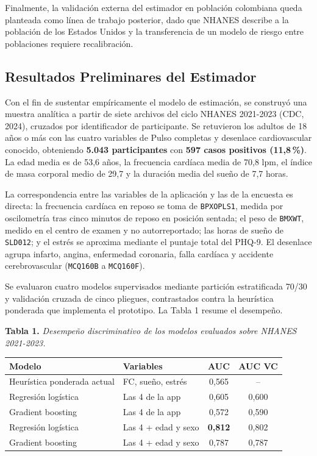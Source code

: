 \documentclass[12pt,letterpaper]{article}
\begin{document}
Finalmente, la validación externa del estimador en población colombiana queda
planteada como línea de trabajo posterior, dado que NHANES describe a la
población de los Estados Unidos y la transferencia de un modelo de riesgo entre
poblaciones requiere recalibración.

\subsection{Resultados Preliminares del Estimador}

Con el fin de sustentar empíricamente el modelo de estimación, se construyó una
muestra analítica a partir de siete archivos del ciclo NHANES 2021-2023 (CDC,
2024), cruzados por identificador de participante. Se retuvieron los adultos de
18 años o más con las cuatro variables de Pulso completas y desenlace
cardiovascular conocido, obteniendo \textbf{5.043 participantes} con
\textbf{597 casos positivos (11,8\,\%)}. La edad media es de 53,6 años, la
frecuencia cardíaca media de 70,8 lpm, el índice de masa corporal medio de 29,7 y
la duración media del sueño de 7,7 horas.

La correspondencia entre las variables de la aplicación y las de la encuesta es
directa: la frecuencia cardíaca en reposo se toma de \texttt{BPXOPLS1}, medida
por oscilometría tras cinco minutos de reposo en posición sentada; el peso de
\texttt{BMXWT}, medido en el centro de examen y no autorreportado; las horas de
sueño de \texttt{SLD012}; y el estrés se aproxima mediante el puntaje total del
PHQ-9. El desenlace agrupa infarto, angina, enfermedad coronaria, falla cardíaca
y accidente cerebrovascular (\texttt{MCQ160B} a \texttt{MCQ160F}).

Se evaluaron cuatro modelos supervisados mediante partición estratificada 70/30 y
validación cruzada de cinco pliegues, contrastados contra la heurística ponderada
que implementa el prototipo. La Tabla 1 resume el desempeño.

\vspace{0.3cm}
\noindent\textbf{Tabla 1.} \textit{Desempeño discriminativo de los modelos
evaluados sobre NHANES 2021-2023.}

\vspace{0.2cm}
\noindent\begin{tabular}{p{5.1cm}p{3.6cm}cc}
\hline
\textbf{Modelo} & \textbf{Variables} & \textbf{AUC} & \textbf{AUC VC} \\
\hline
Heurística ponderada actual & FC, sueño, estrés & 0,565 & -- \\
Regresión logística & Las 4 de la app & 0,605 & 0,600 \\
Gradient boosting & Las 4 de la app & 0,572 & 0,590 \\
Regresión logística & Las 4 + edad y sexo & \textbf{0,812} & 0,802 \\
Gradient boosting & Las 4 + edad y sexo & 0,787 & 0,787 \\
\hline
\end{tabular}
\end{document}
